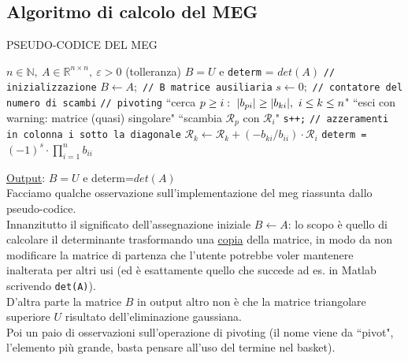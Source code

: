 \subsection{Algoritmo di calcolo del MEG}
\begin{algorithm}
\caption{PSEUDO-CODICE DEL MEG}
\begin{algorithmic}
    \REQUIRE $n \in \mathbb{N}, \ A \in \mathbb{R}^{n \times n}, \ \varepsilon > 0$ (tolleranza)
    \ENSURE $B = U$ e \verb|determ| = $det(A)$
    \STATE \verb|// inizializzazione|
    \STATE $B \leftarrow A;$ \verb|// B matrice ausiliaria|
    \STATE $s \leftarrow 0;$ \verb|// contatore del numero di scambi|
        \STATE \verb|// pivoting|
        \STATE ``cerca $p \ge i: \ \lvert b_{pi}\rvert \ge \lvert b_{ki}\rvert, \ i \le k \le n$"
            \STATE ``esci con warning: matrice (quasi) singolare"
        \ENDIF
            \STATE ``scambia $\mathcal{R}_p$ con $\mathcal{R}_i$"
            \STATE \verb|s++;|
        \ENDIF
        \STATE \verb|// azzeramenti in colonna i sotto la diagonale|
            \STATE $\mathcal{R}_k \leftarrow \mathcal{R}_k + (-b_{ki}/b_{ii}) \cdot \mathcal{R}_i$
        \ENDFOR
    \ENDFOR
    \STATE \verb|determ = | $(-1)^s \cdot \prod_{i=1}^n b_{ii}$
\end{algorithmic}
\end{algorithm}
\uline{Output}: $B=U$ e determ=$det(A)$\\
Facciamo qualche osservazione sull'implementazione del meg riassunta dallo pseudo-codice.\\
Innanzitutto il significato dell'assegnazione iniziale $B \leftarrow A$: lo scopo è quello di calcolare il determinante trasformando una \uline{copia} della matrice, in modo da non modificare la matrice di partenza che l'utente potrebbe voler mantenere inalterata per altri usi (ed è esattamente quello che succede ad es. in Matlab scrivendo \verb|det(A)|).\\
D'altra parte la matrice $B$ in output altro non è che la matrice triangolare superiore $U$ risultato dell'eliminazione gaussiana.\\
Poi un paio di osservazioni sull'operazione di pivoting (il nome viene da ``pivot", l'elemento più grande, basta pensare all'uso del termine nel basket).\\
